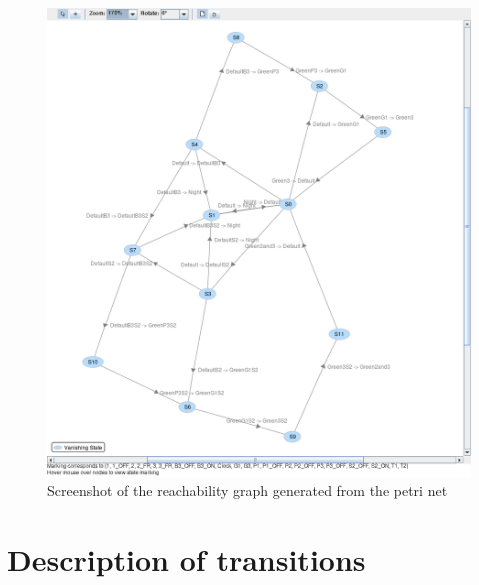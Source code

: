 \documentclass[letterpaper,12pt]{article}
\begin{document}
\begin{figure}[H]
 \centering
 \includegraphics[width=\textwidth]{reachabilitygraph.png}
 \caption{Screenshot of the reachability graph generated from the petri net}
\end{figure}


\section{Description of transitions}
\end{document}
